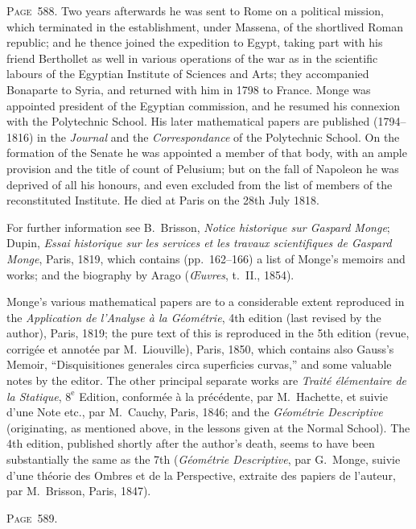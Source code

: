 \documentclass[11pt,a4paper]{book}
\begin{document}
\newpage
\noindent\textsc{Page~588.} Two years afterwards he was sent to Rome on a political mission, which terminated in the establishment, under Massena, of the shortlived Roman republic; and he thence joined the expedition to Egypt, taking part with his friend Berthollet as well in various operations of the war as in the scientific labours of the Egyptian Institute of Sciences and Arts; they accompanied Bonaparte to Syria, and returned with him in 1798 to France. Monge was appointed president of the Egyptian commission, and he resumed his connexion with the Polytechnic School. His later mathematical papers are published (1794--1816) in the \textit{Journal} and the \textit{Correspondance} of the Polytechnic School. On the formation of the Senate he was appointed a member of that body, with an ample provision and the title of count of Pelusium; but on the fall of Napoleon he was deprived of all his honours, and even excluded from the list of members of the reconstituted Institute. He died at Paris on the 28th July 1818.

For further information see B.\ Brisson, \textit{Notice historique sur Gaspard Monge}; Dupin, \textit{Essai historique sur les services et les travaux scientifiques de Gaspard Monge}, Paris, 1819, which contains (pp.~162--166) a list of Monge's memoirs and works; and the biography by Arago (\textit{\OE uvres}, t.~II., 1854).

Monge's various mathematical papers are to a considerable extent reproduced in the \textit{Application de l'Analyse \`a la G\'eom\'etrie}, 4th edition (last revised by the author), Paris, 1819; the pure text of this is reproduced in the 5th edition (revue, corrig\'ee et annot\'ee par M.\ Liouville), Paris, 1850, which contains also Gauss's Memoir, ``Disquisitiones generales circa superficies curvas,'' and some valuable notes by the editor. The other principal separate works are \textit{Trait\'e \'el\'ementaire de la Statique}, $8^{\text{e}}$ Edition, conform\'ee \`a la pr\'ec\'edente, par M.\ Hachette, et suivie d'une Note etc., par M.\ Cauchy, Paris, 1846; and the \textit{G\'eom\'etrie Descriptive} (originating, as mentioned above, in the lessons given at the Normal School). The 4th edition, published shortly after the author's death, seems to have been substantially the same as the 7th (\textit{G\'eom\'etrie Descriptive}, par G.\ Monge, suivie d'une th\'eorie des Ombres et de la Perspective, extraite des papiers de l'auteur, par M.\ Brisson, Paris, 1847).

\newpage
\noindent\textsc{Page~589.}
\end{document}

